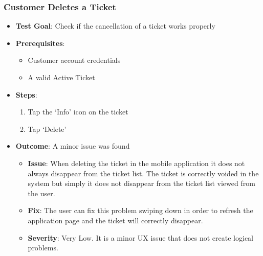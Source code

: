 \subsubsection{Customer Deletes a Ticket}
\begin{itemize}
    \item \textbf{Test Goal}: Check if the cancellation of a ticket works properly
    \item \textbf{Prerequisites}:
          \begin{itemize}
              \item Customer account credentials
              \item A valid Active Ticket
          \end{itemize}
    \item \textbf{Steps}:
          \begin{enumerate}
              \item Tap the `Info' icon on the ticket
              \item Tap `Delete'
          \end{enumerate}
    \item \textbf{Outcome}: A minor issue was found
          \begin{itemize}
              \item \textbf{Issue}: When deleting the ticket in the mobile application it does not always disappear from the ticket list. The ticket is correctly voided in the
                    system but simply it does not disappear from the ticket list viewed from the user.
              \item \textbf{Fix}: The user can fix this problem swiping down in order to refresh the application page and the ticket will correctly disappear.
              \item \textbf{Severity}: Very Low. It is a minor UX issue that does not create logical problems.
          \end{itemize}
\end{itemize}
